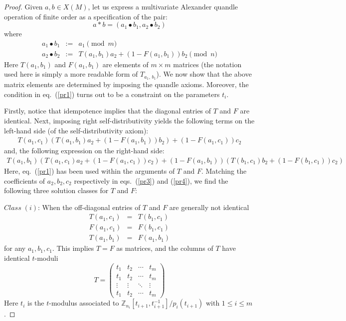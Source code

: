 \documentclass[a4paper,12pt]{article}
\newcommand{\Z}{\mathbb{Z}}
\begin{document}
\begin{proof}
Given $a, b \in X(M)$, let us express a multivariate Alexander quandle operation of finite order as a specification of the pair:      
$$a * b = (a_1 \bullet b_1, a_2 \bullet b_2)$$   
where 
\begin{eqnarray}
a_1 \bullet b_1 &:=& a_1 \pmod{m}  \label{pr1}  \\
a_2 \bullet b_2 &:=& T(a_1, b_1) a_2 + (1 - F(a_1, b_1)) b_2 \pmod{n}   \label{pr2} 
\end{eqnarray}  
Here $T (a_1, b_1)$ and $F (a_1, b_1)$ are elements of $m \times m$ matrices (the notation used here is simply a more readable form of $T_{a_1, \, b_1}$). We now show that the above matrix elements are determined by imposing the quandle axioms. Moreover, the condition in eq.~(\ref{pr1})  turns  out to be a constraint on the parameters $t_i$.  

Firstly, notice that idempotence implies that the diagonal entries of $T$ and $F$ are identical. Next, imposing right self-distributivity yields the following terms on the left-hand side (of the self-distributivity axiom): 
\begin{eqnarray}
T(a_1, c_1) \left( T(a_1, b_1) a_2 + (1 - F(a_1, b_1)) b_2  \right) + (1 - F(a_1, c_1)) c_2
 \label{pr3} 
\end{eqnarray}
and, the following expression on the right-hand side: 
\begin{eqnarray}
T(a_1, b_1) \left( T(a_1, c_1) a_2 + (1 - F(a_1, c_1)) c_2  \right) + (1 - F(a_1, b_1)) \left( T(b_1, c_1) b_2 + (1 - F(b_1, c_1)) c_2  \right) 
 \label{pr4} 
\end{eqnarray}
Here, eq.~(\ref{pr1}) has been used within the arguments of $T$ and $F$. Matching the coefficients of $a_2, b_2, c_2$ respectively in eqs.~(\ref{pr3}) and (\ref{pr4}), we find the following three solution classes for $T$ and $F$: 

$Class \; (i)$:  When the off-diagonal entries of $T$ and $F$ are generally not identical
\begin{eqnarray}
T(a_1, c_1) &=& T(b_1, c_1)   \nonumber \\
F(a_1, c_1) &=& F(b_1, c_1)   \nonumber \\
T(a_1, b_1) &=& F(a_1, b_1)   \nonumber 
\end{eqnarray}
for any $a_1, b_1, c_1$. This implies $T = F$ as matrices, and the columns of $T$ have identical $t$-moduli
\[ T =  \begin{pmatrix}
    t_{1} & t_{2} & \cdots & t_{m} \\
    t_{1} & t_{2} & \cdots & t_{m} \\
    \vdots & \vdots & \ddots & \vdots \\
    t_{1} & t_{2} & \cdots & t_{m}
\end{pmatrix}    \]
Here $t_i$ is the $t$-modulus associated to $\Z_{n_i} [t_{i+1}, t_{i+1}^{-1}]/p_i (t_{i+1})$ with $1 \leq i \leq m$.  


\end{proof}
\end{document}

